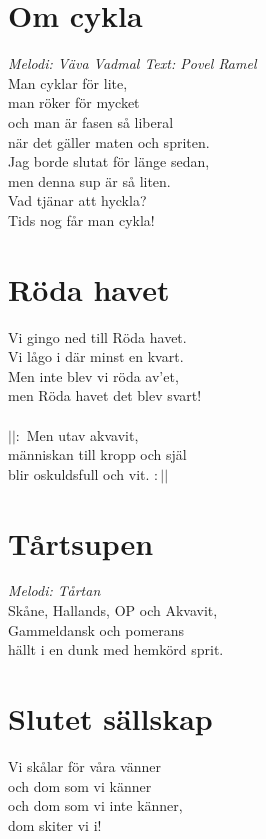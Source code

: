 \section{Om cykla}
\textit{Melodi: Väva Vadmal \vspace{5mm} Text: Povel Ramel}
\vspace{2mm}\\
Man cyklar för lite,\\
man röker för mycket \\
och man är fasen så liberal\\
när det gäller maten och spriten.\\
Jag borde slutat för länge sedan,\\
men denna sup är så liten.\\
Vad tjänar att hyckla? \\
Tids nog får man cykla!

\section{Röda havet}
Vi gingo ned till Röda havet.\\
Vi lågo i där minst en kvart.\\
Men inte blev vi röda av'et,\\
men Röda havet det blev svart! \\
\\
$||:$ Men utav akvavit,\\
människan till kropp och själ\\
blir oskuldsfull och vit. $:||$

\section{Tårtsupen}
\textit{Melodi: Tårtan}
\vspace{2mm}\\
Skåne, Hallands, OP och Akvavit,\\
Gammeldansk och pomerans\\
hällt i en dunk med hemkörd sprit.

\section{Slutet sällskap}
Vi skålar för våra vänner\\
och dom som vi känner\\
och dom som vi inte känner,\\
dom skiter vi i!

